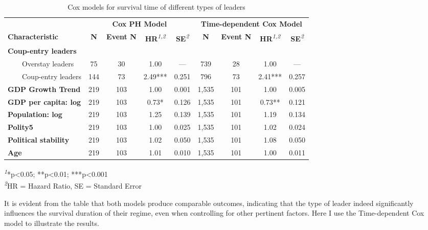 \documentclass[
  12pt,
  a4paper,
  12pt]{article}
\begin{document}
\begin{longtable}{lcccccccc}

\caption{\label{tbl-cox}Cox models for survival time of different types
of leaders}

\tabularnewline

\toprule
 & \multicolumn{4}{c}{\textbf{Cox PH Model}} & \multicolumn{4}{c}{\textbf{Time-dependent Cox Model}} \\ 
\cmidrule(lr){2-5} \cmidrule(lr){6-9}
\textbf{Characteristic} & \textbf{N} & \textbf{Event N} & \textbf{HR}\textsuperscript{\textit{1,2}} & \textbf{SE}\textsuperscript{\textit{2}} & \textbf{N} & \textbf{Event N} & \textbf{HR}\textsuperscript{\textit{1,2}} & \textbf{SE}\textsuperscript{\textit{2}} \\ 
\midrule\addlinespace[2.5pt]
\textbf{Coup-entry leaders} &  &  &  &  &  &  &  &  \\ 
    Overstay leaders & 75 & 30 & 1.00 & — & 739 & 28 & 1.00 & — \\ 
    Coup-entry leaders & 144 & 73 & 2.49*** & 0.251 & 796 & 73 & 2.41*** & 0.257 \\ 
\textbf{GDP Growth Trend} & 219 & 103 & 1.00 & 0.001 & 1,535 & 101 & 1.00 & 0.005 \\ 
\textbf{GDP per capita: log} & 219 & 103 & 0.73* & 0.126 & 1,535 & 101 & 0.73** & 0.121 \\ 
\textbf{Population: log} & 219 & 103 & 1.25 & 0.139 & 1,535 & 101 & 1.19 & 0.134 \\ 
\textbf{Polity5} & 219 & 103 & 1.00 & 0.025 & 1,535 & 101 & 1.02 & 0.024 \\ 
\textbf{Political stability} & 219 & 103 & 1.02 & 0.050 & 1,535 & 101 & 1.08 & 0.050 \\ 
\textbf{Age} & 219 & 103 & 1.01 & 0.010 & 1,535 & 101 & 1.00 & 0.011 \\ 
\bottomrule

\end{longtable}

\begin{minipage}{\linewidth}
\textsuperscript{\textit{1}}*p\textless{}0.05; **p\textless{}0.01; ***p\textless{}0.001\\
\textsuperscript{\textit{2}}HR = Hazard Ratio, SE = Standard Error\\
\end{minipage}

It is evident from the table that both models produce comparable
outcomes, indicating that the type of leader indeed significantly
influences the survival duration of their regime, even when controlling
for other pertinent factors. Here I use the Time-dependent Cox model to
illustrate the results.
\end{document}
